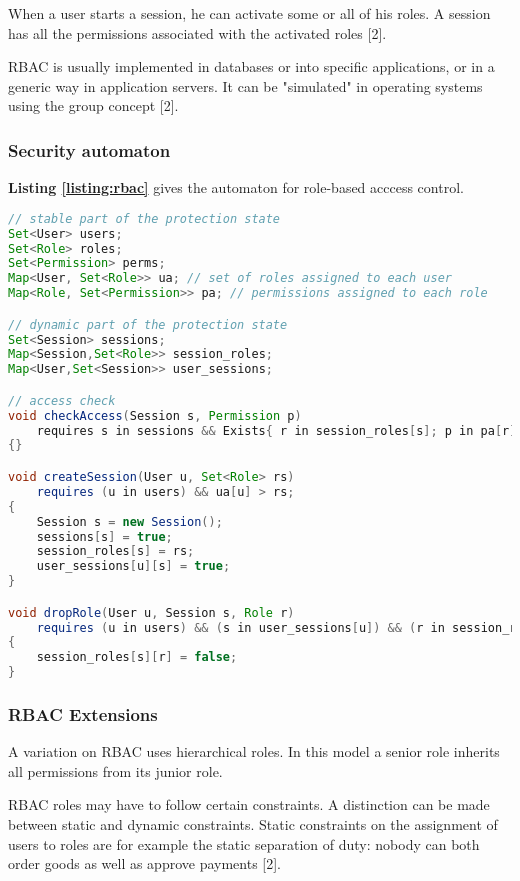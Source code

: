 When a user starts a session, he can activate some or all of his roles. A session has all the permissions associated with the activated roles [2].

RBAC is usually implemented in databases or into specific applications, or in a generic way in application servers. It can be "simulated" in operating systems using the group concept [2].




\subsubsection{Security automaton}

\textbf{Listing \ref{listing:rbac}} gives the automaton for role-based acccess control.

\begin{lstlisting}[language=java, caption=Security automaton for RBAC., label=listing:rbac]
// stable part of the protection state
Set<User> users; 
Set<Role> roles;
Set<Permission> perms;
Map<User, Set<Role>> ua; // set of roles assigned to each user
Map<Role, Set<Permission>> pa; // permissions assigned to each role

// dynamic part of the protection state
Set<Session> sessions;
Map<Session,Set<Role>> session_roles;
Map<User,Set<Session>> user_sessions;

// access check
void checkAccess(Session s, Permission p) 
	requires s in sessions && Exists{ r in session_roles[s]; p in pa[r]};
{}

void createSession(User u, Set<Role> rs) 
	requires (u in users) && ua[u] > rs;
{
	Session s = new Session();
	sessions[s] = true; 
	session_roles[s] = rs;
	user_sessions[u][s] = true;
}

void dropRole(User u, Session s, Role r) 
	requires (u in users) && (s in user_sessions[u]) && (r in session_roles[s]);
{
	session_roles[s][r] = false;
}
\end{lstlisting}



\subsubsection{RBAC Extensions}

A variation on RBAC uses hierarchical roles. In this model a senior role inherits all permissions from its junior role.

RBAC roles may have to follow certain constraints. A distinction can be made between static and dynamic constraints. Static constraints on the assignment of users to roles are for example the static separation of duty: nobody can both order goods as well as approve payments [2].


